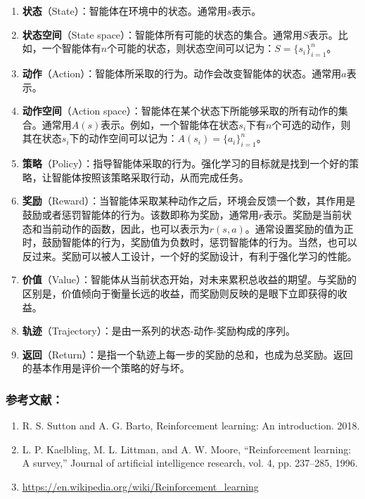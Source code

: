 \begin{enumerate}
\item \textbf{状态}（State）：智能体在环境中的状态。通常用$s$表示。
\item \textbf{状态空间}（State space）：智能体所有可能的状态的集合。通常用$S$表示。比如，一个智能体有$n$个可能的状态，则状态空间可以记为：$S=\{s_i\}_{i=1}^{n}$。
\item \textbf{动作}（Action）：智能体所采取的行为。动作会改变智能体的状态。通常用$a$表示。
\item \textbf{动作空间}（Action space）：智能体在某个状态下所能够采取的所有动作的集合。通常用$A(s)$表示。例如，一个智能体在状态$s_i$下有$n$个可选的动作，则其在状态$s_i$下的动作空间可以记为：$A(s_i)=\{a_i\}_{i=1}^{n}$。
\item \textbf{策略}（Policy）：指导智能体采取的行为。强化学习的目标就是找到一个好的策略，让智能体按照该策略采取行动，从而完成任务。
\item \textbf{奖励}（Reward）：当智能体采取某种动作之后，环境会反馈一个数，其作用是鼓励或者惩罚智能体的行为。该数即称为奖励，通常用$r$表示。奖励是当前状态和当前动作的函数，因此，也可以表示为$r(s,a)$。通常设置奖励的值为正时，鼓励智能体的行为，奖励值为负数时，惩罚智能体的行为。当然，也可以反过来。奖励可以被人工设计，一个好的奖励设计，有利于强化学习的性能。
\item \textbf{价值}（Value）：智能体从当前状态开始，对未来累积总收益的期望。与奖励的区别是，价值倾向于衡量长远的收益，而奖励则反映的是眼下立即获得的收益。
\item \textbf{轨迹}（Trajectory）：是由一系列的状态-动作-奖励构成的序列。
\item \textbf{返回}（Return）：是指一个轨迹上每一步的奖励的总和，也成为总奖励。返回的基本作用是评价一个策略的好与坏。
\end{enumerate}



\subsubsection{参考文献：}
\begin{enumerate}
\item R. S. Sutton and A. G. Barto, Reinforcement learning: An introduction. 2018.
\item L. P. Kaelbling, M. L. Littman, and A. W. Moore, “Reinforcement learning: A survey,” Journal of artificial intelligence research, vol. 4, pp. 237–285, 1996.
\item \href{https://en.wikipedia.org/wiki/Reinforcement\%5C_learning}{https://en.wikipedia.org/wiki/Reinforcement\_learning}
\end{enumerate}
